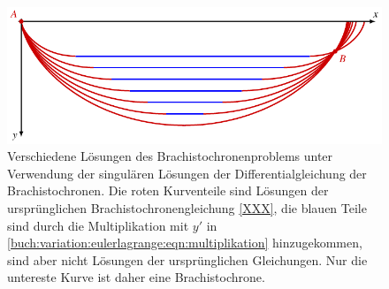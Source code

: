 %
%
%
\begin{figure}
\centering
\includegraphics{chapters/020-variation/images/singulaer.pdf}
\caption{Verschiedene Lösungen des Brachistochronenproblems
unter Verwendung der singulären Lösungen
der Differentialgleichung der Brachistochronen.
Die roten Kurventeile sind Lösungen der ursprünglichen
Brachistochronengleichung
\eqref{XXX},
die blauen Teile sind durch die Multiplikation mit $y'$ in
\eqref{buch:variation:eulerlagrange:eqn:multiplikation}
hinzugekommen, sind aber nicht Lösungen der ursprünglichen
Gleichungen.
Nur die untereste Kurve ist daher eine Brachistochrone.
\label{buch:variation:eulerlagrange:fig:brachloes}}
\end{figure}
